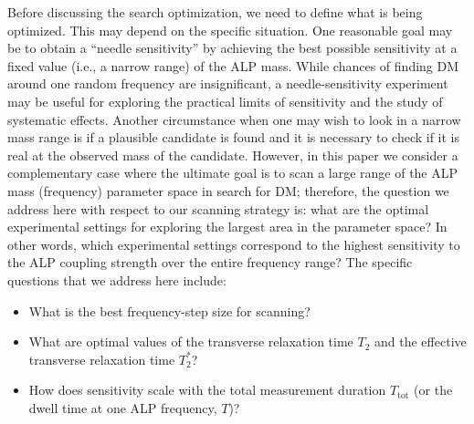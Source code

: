 \documentclass{WileyMSP-template}
\newcommand{\AW}[1]{\textcolor{cyan}{Arne: #1}}
\begin{document}
	Before discussing the search optimization, we need to define what is being optimized. This may depend on the specific situation. One reasonable goal may be to obtain a ``needle sensitivity'' by achieving the best possible sensitivity at a fixed value (i.e., a narrow range) of the ALP mass. While chances of finding DM around one random frequency are insignificant, a needle-sensitivity experiment may be useful for exploring the practical limits of sensitivity and the study of systematic effects. Another circumstance when one may wish to look in a narrow mass range is if a plausible candidate is found and it is necessary to check if it is real at the observed mass of the candidate. However, in this paper we consider a complementary case where the ultimate goal is to scan a large range of the ALP mass (frequency) parameter space in search for DM; therefore, the question we address here with respect to our scanning strategy is: 
	what are the optimal experimental settings for exploring the largest area in the parameter space? In other words, which experimental settings correspond to the highest sensitivity to the ALP coupling strength over the entire frequency range? 
	The specific questions that we address here include:
	\begin{itemize}
		\item What is the best frequency-step size for scanning?
		\item What are optimal values of the transverse relaxation time $T_2$ and the effective transverse relaxation time $T_2^*$?
		\item How does sensitivity scale with the total measurement duration $T_{\mathrm{tot}}$ (or the dwell time at one ALP frequency, $T$)?
	\end{itemize}
\end{document}
